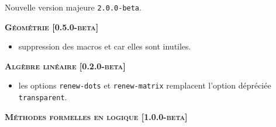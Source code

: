 Nouvelle version majeure \verb+2.0.0-beta+.




\begin{center}
    \textbf{\textsc{Géométrie [0.5.0-beta]}}
\end{center}

\begin{itemize}[itemsep=.5em]
    \item {}
          suppression des macros  et  car elles sont inutiles.


\end{itemize}


\separation




\begin{center}
    \textbf{\textsc{Algèbre linéaire [0.2.0-beta]}}
\end{center}

\begin{itemize}[itemsep=.5em]
    \item {}
          les options \verb#renew-dots# et \verb#renew-matrix# remplacent l'option dépréciée \verb#transparent#.


\end{itemize}


\separation




\begin{center}
    \textbf{\textsc{Méthodes formelles en logique [1.0.0-beta]}}
\end{center}

